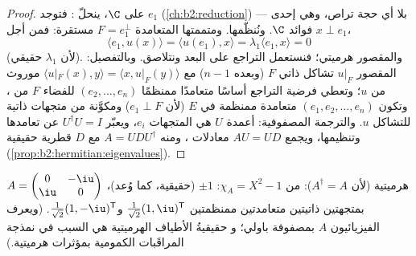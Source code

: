 \begin{proof}
على $\C$، ينحلّ : فتوجد 
$e_1$ (\cref{ch:b2:reduction}) --- بلا أي حجة تراص،
وهي إحدى فوائد $\C$. ونُنظّمها. ومتممتها
المتعامدة $F = e_1^\perp$ مستقرة: فمن أجل $x \perp e_1$،
\[
\langle e_1, u(x)\rangle = \langle u(e_1), x\rangle
= \lambda_1\langle e_1, x\rangle = 0
\]
(لأن $\lambda_1$ حقيقي). والمقصور هرميتي؛ فنستعمل التراجع على
البعد ونتلاصق. وبالتفصيل: المقصور $u|_F$
تشاكل ذاتي  $F$ (وبعده $n - 1$)
مع $\langle u|_F(x), y\rangle = \langle x, u|_F(y)\rangle$
موروث من $u$؛ وتعطي فرضية التراجع أساسًا
متعامدًا ممنظمًا $(e_2, \dots, e_n)$ للفضاء $F$ من ،
وتكون $(e_1, e_2, \dots, e_n)$ متعامدة ممنظمة في $E$ (لأن $e_1 \perp
F$) ومكوَّنة من متجهات ذاتية للتشاكل $u$. والترجمة المصفوفية:
أعمدة $U$ هي المتجهات $e_i$، ويعبّر $U^\dagger U = I$ عن
تعامدها وتنظيمها، ويجمع $AU = UD$ معادلات ، ومنه $A = UDU^\dagger$ مع $D$ قطرية حقيقية
(\cref{prop:b2:hermitian:eigenvalues}).
\end{proof}

\begin{example}\label{ex:b2:hermitian:pauli}
$A = \begin{pmatrix} 0 & -\iu\\ \iu & 0\end{pmatrix}$ هرميتية
(لأن $A^\dagger = A$):  من $\chi_A = X^2 - 1$: $\pm 1$
(حقيقية، كما وُعد)، بمتجهتين ذاتيتين متعامدتين ممنظمتين
$\frac{1}{\sqrt2}(1, \iu)^{\mathsf T}$ و$\frac{1}{\sqrt2}(1,
-\iu)^{\mathsf T}$. (ويعرف الفيزيائيون $A$ بمصفوفة باولي؛ و
حقيقيةُ الأطياف الهرميتية هي السبب في نمذجة المراقَبات الكمومية
بمؤثرات هرميتية.)
\end{example}

